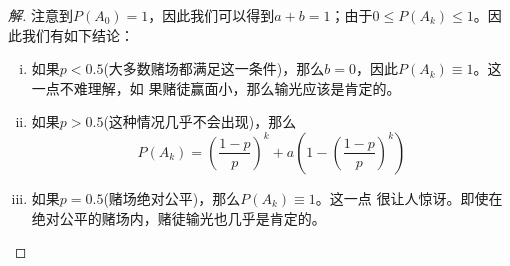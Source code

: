 \documentclass[11pt]{article}
\begin{document}
\begin{enumerate}
\begin{proof}[解]
	注意到$P(A_0)=1$，因此我们可以得到$a+b=1$；由于$0\le P(A_k)\le 1$。因此我们有如下结论：
	\begin{enumerate}[i)]
		\item 如果$p<0.5$(大多数赌场都满足这一条件)，那么$b=0$，因此$P(A_k)\equiv 1$。这一点不难理解，如 果赌徒赢面小，那么输光应该是肯定的。
		\item 如果$p>0.5$(这种情况几乎不会出现)，那么
		\begin{equation}
		P(A_k)=\left(\frac{1-p}{p}\right)^k+a\left(1-\left(\frac{1-p}{p}\right)^k\right)
		\end{equation}
		\item 如果$p=0.5$(赌场绝对公平)，那么$P(A_k)\equiv1$。这一点
		很让人惊讶。即使在绝对公平的赌场内，赌徒输光也几乎是肯定的。
	\end{enumerate}
\end{proof}

\end{enumerate}
\end{document}

